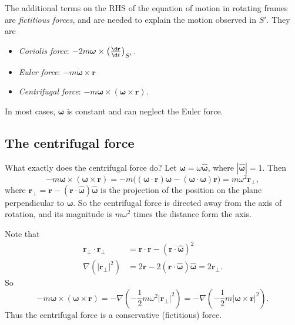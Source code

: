 \documentclass[a4paper]{article}
\begin{document}
\begin{defi}
  The additional terms on the RHS of the equation of motion in rotating frames are \emph{fictitious forces}, and are needed to explain the motion observed in $S'$. They are
  \begin{itemize}
    \item \emph{Coriolis force}: $-2m\boldsymbol\omega \times \left(\frac{\d \mathbf{r}}{\d t}\right)_{S'}.$
    \item \emph{Euler force}: $-m\dot{\boldsymbol\omega}\times \mathbf{r}$
    \item \emph{Centrifugal force}: $-m\boldsymbol\omega\times(\boldsymbol\omega\times \mathbf{r})$.
  \end{itemize}
\end{defi}
In most cases, $\boldsymbol \omega$ is constant and can neglect the Euler force.
\subsection{The centrifugal force}
What exactly does the centrifugal force do? Let $\boldsymbol\omega = \omega\hat{\boldsymbol\omega}$, where $|\hat{\boldsymbol\omega}| = 1$. Then
\[
  -m\boldsymbol\omega \times (\boldsymbol\omega \times \mathbf{r}) = -m\big((\boldsymbol\omega \cdot \mathbf{r})\boldsymbol\omega - (\boldsymbol\omega \cdot \boldsymbol\omega)\mathbf{r}\big) = m\omega^2 \mathbf{r}_{\bot},
\]
where $\mathbf{r}_{\bot} = \mathbf{r} - (\mathbf{r}\cdot \hat{\boldsymbol\omega})\hat{\boldsymbol\omega}$ is the projection of the position on the plane perpendicular to $\boldsymbol\omega$. So the centrifugal force is directed away from the axis of rotation, and its magnitude is $m\omega^2$ times the distance form the axis.
\begin{center}
\end{center}
Note that
\begin{align*}
  \mathbf{r}_\bot \cdot \mathbf{r}_\bot &= \mathbf{r}\cdot \mathbf{r} - (\mathbf{r} \cdot \hat{\boldsymbol\omega})^2\\
  \nabla(|\mathbf{r}_\bot|^2) &= 2\mathbf{r} - 2(\mathbf{r}\cdot \hat{\boldsymbol\omega})\hat{\boldsymbol\omega} = 2\mathbf{r}_\bot.
\end{align*}
So
\[
  -m\boldsymbol\omega\times(\boldsymbol\omega\times \mathbf{r}) = -\nabla\left(-\frac{1}{2}m\omega^2|\mathbf{r}_\bot|^2\right) = -\nabla\left(-\frac{1}{2}m|\boldsymbol\omega\times \mathbf{r}|^2\right).
\]
Thus the centrifugal force is a conservative (fictitious) force.
\end{document}
